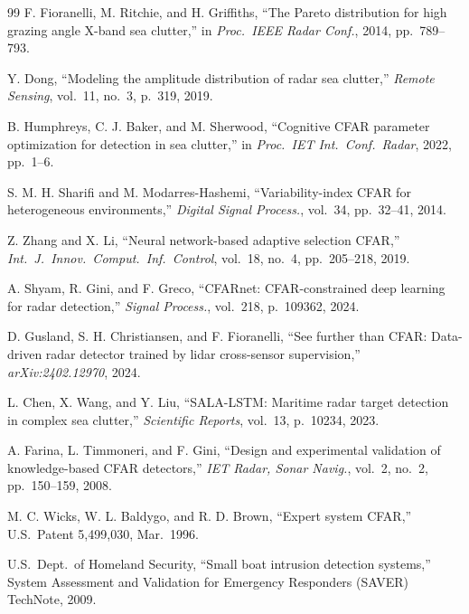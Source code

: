 \documentclass[conf]{new-aiaa}
\begin{document}
\begin{thebibliography}{99}
 F. Fioranelli, M. Ritchie, and H. Griffiths, ``The Pareto distribution for high grazing angle X-band sea clutter,'' in \emph{Proc.\ IEEE Radar Conf.}, 2014, pp.~789--793.

 Y. Dong, ``Modeling the amplitude distribution of radar sea clutter,'' \emph{Remote Sensing}, vol.~11, no.~3, p.~319, 2019.

 B. Humphreys, C. J. Baker, and M. Sherwood, ``Cognitive CFAR parameter optimization for detection in sea clutter,'' in \emph{Proc.\ IET Int.\ Conf.\ Radar}, 2022, pp.~1--6.

 S. M. H. Sharifi and M. Modarres-Hashemi, ``Variability-index CFAR for heterogeneous environments,'' \emph{Digital Signal Process.}, vol.~34, pp.~32--41, 2014.

 Z. Zhang and X. Li, ``Neural network-based adaptive selection CFAR,'' \emph{Int.\ J.\ Innov.\ Comput.\ Inf.\ Control}, vol.~18, no.~4, pp.~205--218, 2019.

 A. Shyam, R. Gini, and F. Greco, ``CFARnet: CFAR-constrained deep learning for radar detection,'' \emph{Signal Process.}, vol.~218, p.~109362, 2024.

 D. Gusland, S. H. Christiansen, and F. Fioranelli, ``See further than CFAR: Data-driven radar detector trained by lidar cross-sensor supervision,'' \emph{arXiv:2402.12970}, 2024.

 L. Chen, X. Wang, and Y. Liu, ``SALA-LSTM: Maritime radar target detection in complex sea clutter,'' \emph{Scientific Reports}, vol.~13, p.~10234, 2023.

 A. Farina, L. Timmoneri, and F. Gini, ``Design and experimental validation of knowledge-based CFAR detectors,'' \emph{IET Radar, Sonar Navig.}, vol.~2, no.~2, pp.~150--159, 2008.

 M. C. Wicks, W. L. Baldygo, and R. D. Brown, ``Expert system CFAR,'' U.S.\ Patent 5,499,030, Mar.\ 1996.

 U.S.\ Dept.\ of Homeland Security, ``Small boat intrusion detection systems,'' System Assessment and Validation for Emergency Responders (SAVER) TechNote, 2009.
\end{thebibliography}
\end{document}
